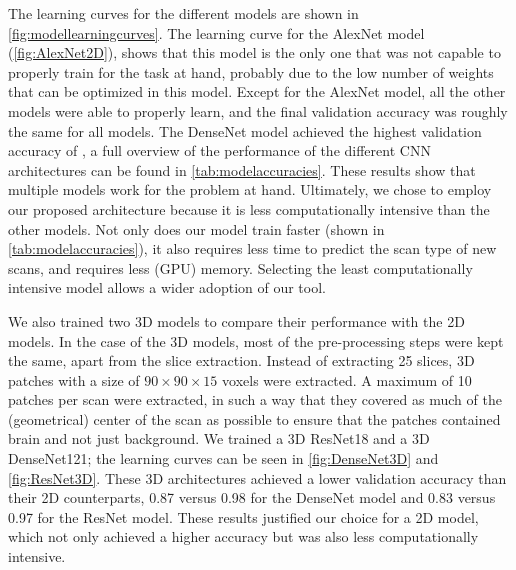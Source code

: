 \begin{subappendices}
The learning curves for the different models are shown in \cref{fig:modellearningcurves}.
The learning curve for the AlexNet model (\cref{fig:AlexNet2D}), shows that this model is the only one that was not capable to properly train for the task at hand, probably due to the low number of weights that can be optimized in this model.
Except for the AlexNet model, all the other models were able to properly learn, and the final validation accuracy was roughly the same for all models.
The DenseNet model achieved the highest validation accuracy of , a full overview of the performance of the different \gls{CNN} architectures can be found in \cref{tab:modelaccuracies}.
These results show that multiple models work for the problem at hand.
Ultimately, we chose to employ our proposed architecture because it is less computationally intensive than the other models.
Not only does our model train faster (shown in \cref{tab:modelaccuracies}), it also requires less time to predict the scan type of new scans, and requires less (GPU) memory.
Selecting the least computationally intensive model allows a wider adoption of our tool.

We also trained two 3D models to compare their performance with the 2D models.
In the case of the 3D models, most of the pre-processing steps were kept the same, apart from the \gls{slice} extraction.
Instead of extracting \num{25} \glspl{slice}, 3D patches with a size of $90\times90\times15$ voxels were extracted.
A maximum of \num{10} patches per \gls{scan} were extracted, in such a way that they covered as much of the (geometrical) center of the \gls{scan} as possible to ensure that the patches contained brain and not just background.
We trained a 3D ResNet18 and a 3D DenseNet121; the learning curves can be seen in \cref{fig:DenseNet3D} and \cref{fig:ResNet3D}.
These 3D architectures achieved a lower validation accuracy than their 2D counterparts, \num{0.87} versus \num{0.98} for the DenseNet model and \num{0.83} versus \num{0.97} for the ResNet model.
These results justified our choice for a 2D model, which not only achieved a higher accuracy but was also less computationally intensive.


\begin{figure}
\centering

\newlength{\modelplotwidth}
\setlength{\modelplotwidth}{0.23\textwidth}


\end{figure}
\end{subappendices}
